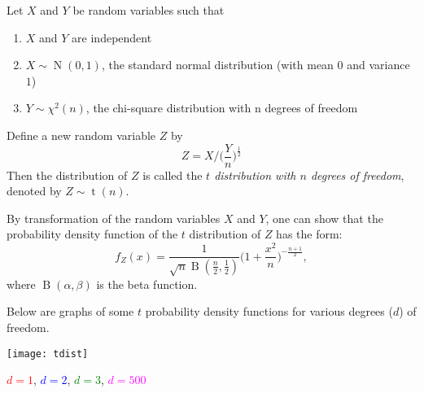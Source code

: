 \documentclass[12pt]{article}
\begin{document}
Let $X$ and $Y$ be random variables such that
\begin{enumerate}
\item $X$ and $Y$ are independent
\item $X\sim \operatorname{N}(0,1)$, the standard normal distribution (with mean $0$ and variance $1$)
\item $Y\sim \chi^2(n)$, the chi-square distribution with n degrees of freedom
\end{enumerate}
Define a new random variable $Z$ by
\[Z=X/\Big(\frac{Y}{n}\Big)^{\frac{1}{2}}\]
Then the distribution of $Z$ is called the \emph{$t$ distribution with $n$ degrees of freedom}, 
denoted by $Z\sim \operatorname{t}(n)$.

By transformation of the random variables $X$ and $Y$, one can show that the probability density function of the $t$ distribution of $Z$ has the form:
$$f_Z(x)=\frac{1}{\sqrt{n}\operatorname{B}(\frac{n}{2},\frac{1}{2})}
\Big(1+\frac{x^2}{n}\Big)^{-\frac{n+1}{2}},$$ 
where $\operatorname{B}(\alpha,\beta)$ is the beta function.

Below are graphs of some $t$ probability density functions for various degrees ($d$) of freedom.

\begin{center}
\texttt{[image: tdist]}

\textcolor{red}{$d=1$}, \textcolor{blue}{$d=2$}, \textcolor{green}{$d=3$}, \textcolor{magenta}{$d=500$}
\end{center}
\end{document}
